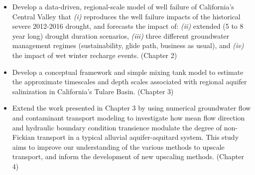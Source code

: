 \begin{itemize}
	
    \item Develop a data-driven, regional-scale model of well failure of California's Central Valley that \textit{(i)} reproduces the well failure impacts of the historical severe 2012-2016 drought, and forecasts the impact of: \textit{(ii)} extended (5 to 8 year long) drought duration scenarios, \textit{(iii)} three different groundwater management regimes (sustainability, glide path, business as usual), and \textit{(iv)} the impact of wet winter recharge events. (Chapter 2)
    
    \item Develop a conceptual framework and simple mixing tank model to estimate the approximate timescales and depth scales associated with regional aquifer salinization in California's Tulare Basin. (Chapter 3)
    
    \item Extend the work presented in Chapter 3 by using numerical groundwater flow and contaminant transport modeling to investigate how mean flow direction and hydraulic boundary condition transience modulate the degree of non-Fickian transport in a typical alluvial aquifer-aquitard system. This study aims to improve our understanding of the various methods to upscale transport, and inform the development of new upscaling methods. (Chapter 4)
   
    
\end{itemize}
